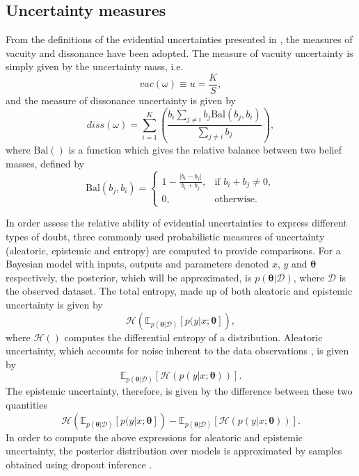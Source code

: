 \documentclass[
twocolumn,
]{ceurart}
\begin{document}
\subsection{Uncertainty measures}
\label{sec::UncertaintyMeasures}
From the definitions of the evidential uncertainties presented in \cite{Josang2018}, the measures of vacuity and dissonance have been adopted.
The measure of vacuity uncertainty is simply given by the uncertainty mass, i.e.
\begin{equation}
    vac(\omega)\equiv u = \frac{K}{S},
\label{eq::vacuity}
\end{equation}
and the measure of dissonance uncertainty is given by
\begin{equation}
    diss(\omega)=\sum_{i=1}^K\left(\frac{b_i\sum_{j\neq i}b_j\textrm{Bal}(b_j,b_i)}{\sum_{j\neq i}b_j}\right),
\end{equation}
where $\textrm{Bal}()$ is a function which gives the relative balance between two belief masses, defined by
\begin{equation}
    \textrm{Bal}(b_j,b_i)=\begin{cases}1-\frac{\vert b_i-b_j\vert}{b_i+b_j},&\text{if } b_i+b_j\neq0,\\
    0,&\text{otherwise.}\end{cases}
\end{equation}

In order assess the relative ability of evidential uncertainties to express different types of doubt, three commonly used probabilistic measures of uncertainty (aleatoric, epistemic and entropy) are computed to provide comparisons.
For a Bayesian model with inputs, outputs and parameters denoted $x$, $y$ and $\boldsymbol{\theta}$ respectively, the posterior, which will be approximated, is $p(\boldsymbol{\theta}\vert\mathcal{D})$, where $\mathcal{D}$ is the observed dataset.
The total entropy, made up of both aleatoric and epistemic uncertainty \cite{Depeweg2018} is given by
\begin{equation}
    \mathcal{H}\left(\mathbb{E}_{p(\boldsymbol{\theta}\vert \mathcal{D})}\left[p(y\vert x;\boldsymbol{\theta}\right]\right),
\end{equation}
where $\mathcal{H}()$ computes the differential entropy of a distribution.
Aleatoric uncertainty, which accounts for noise inherent to the data observations \cite{Kendall2017}, is given by
\begin{equation}
    \mathbb{E}_{p\left(\boldsymbol{\theta}\vert \mathcal{D}\right)}\left[\mathcal{H}(p(y\vert x; \boldsymbol{\theta}))\right].
\end{equation}
The epistemic uncertainty, therefore, is given by the difference between these two quantities
\begin{equation}
    \mathcal{H}\left(\mathbb{E}_{p(\boldsymbol{\theta}\vert \mathcal{D})}\left[p(y\vert x;\boldsymbol{\theta}\right]\right)-\mathbb{E}_{p\left(\boldsymbol{\theta}\vert \mathcal{D}\right)}\left[\mathcal{H}(p(y\vert x; \boldsymbol{\theta}))\right].
\label{eq::epistemic}
\end{equation}
In order to compute the above expressions for aleatoric and epistemic uncertainty, the posterior distribution over models is approximated by samples obtained using dropout inference \cite{Gal2016}.
\end{document}
